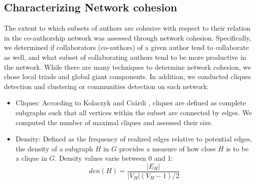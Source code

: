 \subsection{Characterizing Network cohesion}
The extent to which subsets of authors are cohesive with respect to their relation in the co-authorship network was assessed through network cohesion. Specifically, we determined if collaborators (co-authors) of a given author tend to collaborate as well, and what subset of collaborating authors tend to be more productive in the network. While there are many techniques to determine network cohesion, we chose local triads and global giant components. In addition, we conducted cliques detection and clustering or communities detection on each network:
\begin{itemize}
\item Cliques: According to Kolaczyk and Cs\'ardi \cite{kolaczyk_statistical_2014}, cliques are defined as complete subgraphs such that all vertices within the subset are connected by edges. We computed the number of maximal cliques and assessed their size.
\item Density: Defined as the frequency of realized edges relative to potential edges, the density of a subgraph $H$ in $G$ provides a measure of how close $H$ is to be a clique in $G$. Density values varie between 0 and 1:
\begin{equation} 
den(H)=\frac{|E_H|}{|V_H|(V_H-1)/2} 
\end{equation}


\end{itemize}
